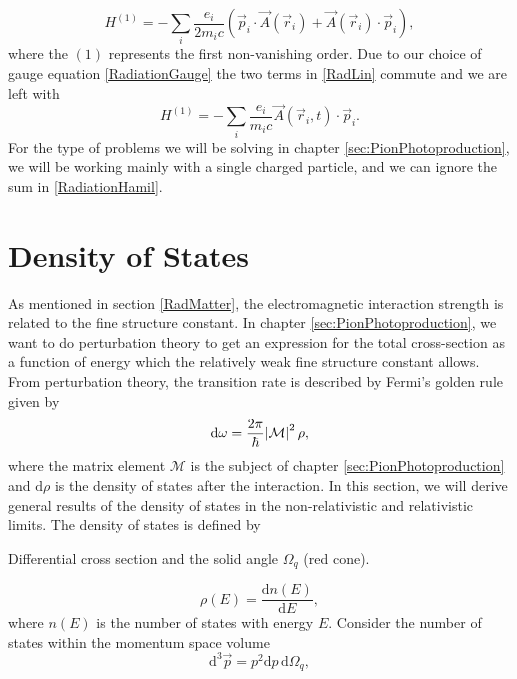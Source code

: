 \begin{equation} \label{RadLin}
	H^{(1)} = -\sum_i \frac{e_i}{2m_i c} (\vec{p}_i\cdot \vec{A}(\vec{r}_i)+\vec{A}(\vec{r}_i)\cdot \vec{p}_i),
\end{equation}
where the $(1)$ represents the first non-vanishing order. Due to our choice of gauge equation \eqref{RadiationGauge} the two terms in \eqref{RadLin} commute and we are left with
\begin{equation} \label{RadiationHamil}
	H^{(1)} = - \sum_i \frac{e_i}{m_i c} \vec{A}(\vec{r}_i,t)\cdot\vec{p}_i.
\end{equation}
For the type of problems we will be solving in chapter \ref{sec:PionPhotoproduction}, we will be working mainly with a single charged particle, and we can ignore the sum in \eqref{RadiationHamil}.
\section{Density of States}\label{sec:densityofstates}
As mentioned in section \ref{RadMatter}, the electromagnetic interaction strength is related to the fine structure constant. In chapter \ref{sec:PionPhotoproduction}, we want to do perturbation theory to get an expression for the total cross-section as a function of energy which the relatively weak fine structure constant allows. From perturbation theory, the transition rate is described by Fermi's golden rule given by
\begin{equation} \label{FermiGolden}
	\text{d}\omega = \frac{2\pi}{\hbar}\abs{\mathcal{M}}^2 \rho,
\end{equation}
where the matrix element $\mathcal{M}$ is the subject of chapter \ref{sec:PionPhotoproduction} and $\text{d}\rho$ is the density of states after the interaction. In this section, we will derive general results of the density of states in the non-relativistic and relativistic limits. The density of states is defined by
\begin{marginfigure}
	\centering
	
	\caption{Differential cross section and the solid angle $\Omega_q$ (red cone).}
	\label{fig:diffcross}
\end{marginfigure}
\begin{equation} \label{DensityOfStates}
	\rho(E) = \frac{\text{d}n(E)}{\text{d}E},
\end{equation}
where $n(E)$ is the number of states with energy $E$. Consider the number of states within the momentum space volume
\begin{equation} \label{momspace}
	\text{d}^3\vec{p} = p^2 \text{d}p \, \text{d}\Omega_q,
\end{equation}
